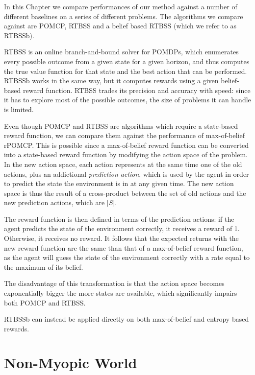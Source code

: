In this Chapter we compare performances of our method against a number of different baselines on
a series of different problems. The algorithms we compare against are POMCP, RTBSS and a belief
based RTBSS (which we refer to as RTBSSb).

RTBSS is an online branch-and-bound solver for POMDPs, which enumerates every possible outcome from
a given state for a given horizon, and thus computes the true value function for that state and
the best action that can be performed. RTBSSb works in the same way, but it computes rewards using a
given belief-based reward function. RTBSS trades its precision and accuracy with speed: since it has
to explore most of the possible outcomes, the size of problems it can handle is limited.

Even though POMCP and RTBSS are algorithms which require a state-based reward function, we can
compare them against the performance of max-of-belief rPOMCP. This is possible since a max-of-belief
reward function can be converted into a state-based reward function by modifying the action space of
the problem. In the new action space, each action represents at the same time one of the old
actions, plus an addictional \textit{prediction action}, which is used by the agent in order to
predict the state the environment is in at any given time. The new action space is thus the result
of a cross-product between the set of old actions and the new prediction actions, which are $|S|$.


The reward function is then defined in terms of the prediction actions: if the agent predicts the
state of the environment correctly, it receives a reward of 1. Otherwise, it receives no reward. It
follows that the expected returns with the new reward function are the same than that of a
max-of-belief reward function, as the agent will guess the state of the environment correctly with a
rate equal to the maximum of its belief.

The disadvantage of this transformation is that the action space becomes exponentially bigger the
more states are available, which significantly impairs both POMCP and RTBSS.

RTBSSb can instead be applied directly on both max-of-belief and entropy based rewards.

\section{Non-Myopic World}  

